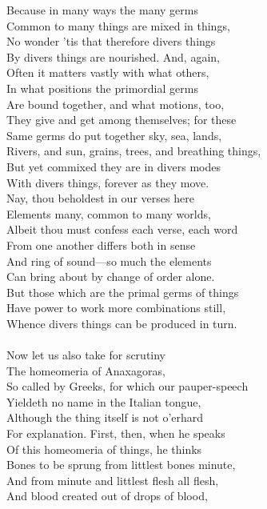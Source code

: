 Because in many ways the many germs\\
Common to many things are mixed in things,\\
No wonder 'tis that therefore divers things\\
By divers things are nourished. And, again,\\
Often it matters vastly with what others,\\
In what positions the primordial germs\\
Are bound together, and what motions, too,\\
They give and get among themselves; for these\\
Same germs do put together sky, sea, lands,\\
Rivers, and sun, grains, trees, and breathing things,\\
But yet commixed they are in divers modes\\
With divers things, forever as they move.\\
Nay, thou beholdest in our verses here\\
Elements many, common to many worlds,\\
Albeit thou must confess each verse, each word\\
From one another differs both in sense\\
And ring of sound—so much the elements\\
Can bring about by change of order alone.\\
But those which are the primal germs of things\\
Have power to work more combinations still,\\
Whence divers things can be produced in turn.\\
\\
Now let us also take for scrutiny\\
The homeomeria of Anaxagoras,\\
So called by Greeks, for which our pauper-speech\\
Yieldeth no name in the Italian tongue,\\
Although the thing itself is not o'erhard\\
For explanation. First, then, when he speaks\\
Of this homeomeria of things, he thinks\\
Bones to be sprung from littlest bones minute,\\
And from minute and littlest flesh all flesh,\\
And blood created out of drops of blood,\\
